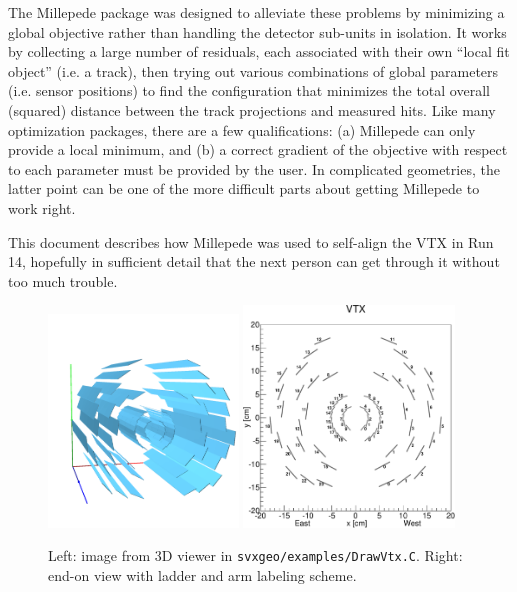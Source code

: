 \documentclass[12pt]{article}
\begin{document}
The Millepede package was designed to alleviate these problems by minimizing a global objective rather than handling the detector sub-units in isolation. It works by collecting a large number of residuals, each associated with their own ``local fit object'' (i.e. a track), then trying out various combinations of global parameters (i.e. sensor positions) to find the configuration that minimizes the total overall (squared) distance between the track projections and measured hits. Like many optimization packages, there are a few qualifications: (a) Millepede can only provide a local minimum, and (b) a correct gradient of the objective with respect to each parameter must be provided by the user. In complicated geometries, the latter point can be one of the more difficult parts about getting Millepede to work right.

This document describes how Millepede was used to self-align the VTX in Run 14, hopefully in sufficient detail that the next person can get through it without too much trouble.

\begin{figure}[tb]
  \begin{center}
    \includegraphics[width=0.45\textwidth]{viewer}
    \quad
    \includegraphics[width=0.5\textwidth]{vtx-xy}
  \end{center}
  \caption{Left: image from 3D viewer in \texttt{svxgeo/examples/DrawVtx.C}. Right: end-on view with ladder and arm labeling scheme.}
  \label{fig:vtx}
\end{figure}
\end{document}
